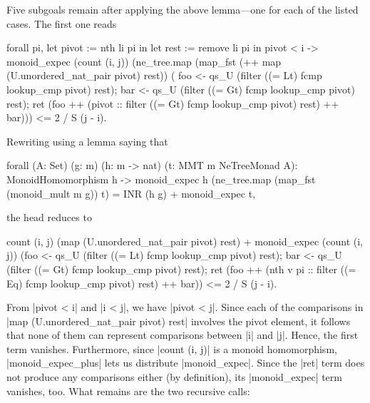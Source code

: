 \documentclass[runningheads]{llncs}
\begin{document}
Five subgoals remain after applying the above lemma---one for each of the listed cases. The first one reads
\begin{code}
  forall pi,
    let pivot := nth li pi in
    let rest := remove li pi in
      pivot < i ->
      monoid_expec (count (i, j))
        (ne_tree.map (map_fst (++ map (U.unordered_nat_pair pivot) rest)) (
          foo <- qs_U (filter ((= Lt) fcmp lookup_cmp pivot) rest);
          bar <- qs_U (filter ((= Gt) fcmp lookup_cmp pivot) rest);
          ret (foo ++ (pivot :: filter ((= Gt) fcmp lookup_cmp pivot) rest) ++ bar)))
        <= 2 / S (j - i).
  \end{code}
Rewriting using a lemma saying that
\begin{code}
  forall (A: Set) (g: m) (h: m -> nat) (t: MMT m NeTreeMonad A):
    MonoidHomomorphism h ->
    monoid_expec h (ne_tree.map (map_fst (monoid_mult m g)) t) =
    INR (h g) + monoid_expec t,
\end{code}
the head reduces to
\begin{code}
    count (i, j) (map (U.unordered_nat_pair pivot) rest) +
    monoid_expec (count (i, j))
      (foo <- qs_U (filter ((= Lt) fcmp lookup_cmp pivot) rest);
      bar <- qs_U (filter ((= Gt) fcmp lookup_cmp pivot) rest);
      ret  (foo ++ (nth v pi :: filter ((= Eq) fcmp lookup_cmp pivot) rest) ++ bar))
    <= 2 / S (j - i).
\end{code}
From |pivot < i| and |i < j|, we have |pivot < j|. Since each of the comparisons in |map (U.unordered_nat_pair pivot) rest| involves the pivot element, it follows that none of them can represent comparisons between |i| and |j|. Hence, the first term vanishes. Furthermore, since |count (i, j)| is a monoid homomorphism, |monoid_expec_plus| lets us distribute |monoid_expec|. Since the |ret| term does not produce any comparisons either (by definition), its |monoid_expec| term vanishes, too. What remains are the two recursive calls:
\end{document}
